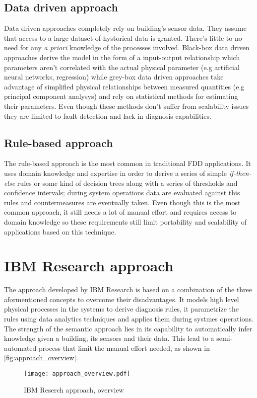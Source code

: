 \subsection{Data driven approach} \label{subsec:data_models}
Data driven approaches completely rely on building's sensor data. They assume that access to a large dataset of hystorical data is granted. There's little to no need for any \textit{a priori} knowledge of the processes involved. Black-box data driven approaches derive the model in the form of a input-output relationship which parameters aren't correlated with the actual physical parameter (e.g artificial neural networks, regression) while grey-box data driven approaches take advantage of simplified physical relationships between measured quantities (e.g principal component analysys) and rely on statistical methods for estimating their parameters. Even though these methods don't suffer from scalability issues they are limited to fault detection and lack in diagnosis capabilities.

\subsection{Rule-based approach} \label{subsec:rule_models}
The rule-based approach is the most common in traditional FDD applications. It uses domain knowledge and expertise in order to derive a series of simple \textit{if-then-else} rules or some kind of decision trees along with a series of thresholds and confidence intervals; during system operations data are evaluated against this rules and countermeasures are eventually taken. Even though this is the most common approach, it still needs a lot of manual effort and requires access to domain knowledge so these requirements still limit portability and scalability of applications based on this technique.

\section{IBM Research approach}
The approach developed by IBM Research is based on a combination of the three aformentioned concepts to overcome their disadvantages. It models high level physical processes in the systems to derive diagnosis rules, it parametrize the rules using data analytics techniques and applies them during systmes operations. The strength of the semantic approach lies in its capability to automatically infer knowledge given a building, its sensors and their data. This lead to a semi-automated process that limit the manual effort needed, as shown in \autoref{fig:approach_overview}.
\begin{figure}
  \centering
  \texttt{[image: approach\_overview.pdf]}
  \caption{IBM Reserch approach, overview}
  \label{fig:approach_overview}
\end{figure}

